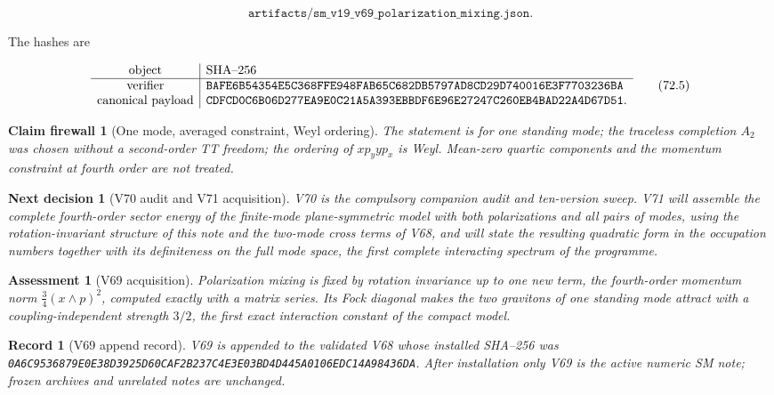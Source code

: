 \documentclass[11pt]{article}
\newtheorem{firewall}[theorem]{Claim firewall}
\newtheorem{decision}[theorem]{Next decision}
\newtheorem{assessment}[theorem]{Assessment}
\newtheorem{record}[theorem]{Record}
\theoremstyle{remark}
\begin{document}
\[
 \texttt{artifacts/sm\_v19\_v69\_polarization\_mixing.json}.         \tag{72.4}
\]

The hashes are

\[
\begin{array}{c|l}
\hbox{object}&\hbox{SHA--256}\\ \hline
\hbox{verifier}&
\texttt{BAFE6B54354E5C368FFE948FAB65C682DB5797AD8CD29D740016E3F7703236BA}\\
\hbox{canonical payload}&
\texttt{CDFCD0C6B06D277EA9E0C21A5A393EBBDF6E96E27247C260EB4BAD22A4D67D51}.
\end{array}                                                     \tag{72.5}
\]

\begin{firewall}[One mode, averaged constraint, Weyl ordering]
\label{fire:v19v69}
The statement is for one standing mode; the traceless completion
\(A_2\) was chosen without a second-order TT freedom; the ordering of
\(xp_yyp_x\) is Weyl.  Mean-zero quartic components and the momentum
constraint at fourth order are not treated.
\end{firewall}

\begin{decision}[V70 audit and V71 acquisition]
\label{dec:v19v69-next}
V70 is the compulsory companion audit and ten-version sweep.  V71 will
assemble the complete fourth-order sector energy of the finite-mode
plane-symmetric model with both polarizations and all pairs of modes,
using the rotation-invariant structure of this note and the two-mode
cross terms of V68, and will state the resulting quadratic form in the
occupation numbers together with its definiteness on the full mode
space, the first complete interacting spectrum of the programme.
\end{decision}

\begin{assessment}[V69 acquisition]
\label{ass:v19v69}
Polarization mixing is fixed by rotation invariance up to one new
term, the fourth-order momentum norm \(\tfrac34(x\wedge p)^2\), computed
exactly with a matrix series.  Its Fock diagonal makes the two
gravitons of one standing mode attract with a coupling-independent
strength \(3/2\), the first exact interaction constant of the compact
model.
\end{assessment}

\begin{record}[V69 append record]
\label{rec:v19v69}
V69 is appended to the validated V68 whose installed SHA--256 was
\texttt{0A6C9536879E0E38D3925D60CAF2B237C4E3E03BD4D445A0106EDC14A98436DA}.
After installation only V69 is the active numeric SM note; frozen
archives and unrelated notes are unchanged.
\end{record}
\end{document}

